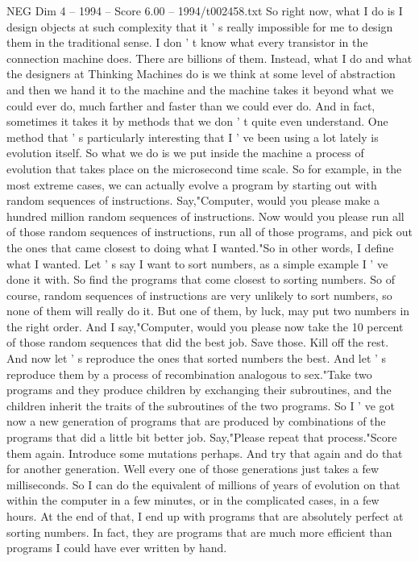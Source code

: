 \begin{textsample}{NEG Dim 4 – 1994 – Score 6.00 – 1994/t002458.txt}
So right now, what I do is I design objects at such complexity that it ' s really impossible for me to design them in the traditional sense.
I don ' t know what every transistor in the connection machine does.
There are billions of them.
Instead, what I do and what the designers at Thinking Machines do is we think at some level of abstraction and then we hand it to the machine and the machine takes it beyond what we could ever do, much farther and faster than we could ever do.
And in fact, sometimes it takes it by methods that we don ' t quite even understand.
One method that ' s particularly interesting that I ' ve been using a lot lately is evolution itself.
So what we do is we put inside the machine a process of evolution that takes place on the microsecond time scale.
So for example, in the most extreme cases, we can actually evolve a program by starting out with random sequences of instructions.
Say,"Computer, would you please make a hundred million random sequences of instructions.
Now would you please run all of those random sequences of instructions, run all of those programs, and pick out the ones that came closest to doing what I wanted."So in other words, I define what I wanted.
Let ' s say I want to sort numbers, as a simple example I ' ve done it with.
So find the programs that come closest to sorting numbers.
So of course, random sequences of instructions are very unlikely to sort numbers, so none of them will really do it.
But one of them, by luck, may put two numbers in the right order.
And I say,"Computer, would you please now take the 10 percent of those random sequences that did the best job.
Save those.
Kill off the rest.
And now let ' s reproduce the ones that sorted numbers the best.
And let ' s reproduce them by a process of recombination analogous to sex."Take two programs and they produce children by exchanging their subroutines, and the children inherit the traits of the subroutines of the two programs.
So I ' ve got now a new generation of programs that are produced by combinations of the programs that did a little bit better job.
Say,"Please repeat that process."Score them again.
Introduce some mutations perhaps.
And try that again and do that for another generation.
Well every one of those generations just takes a few milliseconds.
So I can do the equivalent of millions of years of evolution on that within the computer in a few minutes, or in the complicated cases, in a few hours.
At the end of that, I end up with programs that are absolutely perfect at sorting numbers.
In fact, they are programs that are much more efficient than programs I could have ever written by hand.

\end{textsample}
